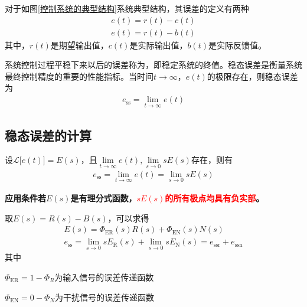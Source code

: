 对于如图\ref{控制系统的典型结构}系统典型结构，其误差的定义有两种
\begin{align}
	e(t) = r(t) - c(t)\\
	e(t) = r(t) - b(t)
\end{align}
其中，$r(t)$是期望输出值，$c(t)$是实际输出值，$b(t)$是实际反馈值。

系统控制过程平稳下来以后的误差称为，即稳定系统的终值。稳态误差是衡量系统最终控制精度的重要的性能指标。当时间$t \to \infty$，$e(t)$的极限存在，则稳态误差为
\begin{align}
	e_{\text{ss}} = \lim\limits_{t \to \infty} e(t)
\end{align}

\subsection{稳态误差的计算}

\ttheorem[终值定理]
设$\mathcal{L}\big[e(t)\big] = E(s)$，且$\lim\limits_{t \to \infty} e(t), \lim\limits_{s \to 0} sE(s)$存在，则有
\begin{align}
	e_{\text{ss}} = \lim\limits_{t \to \infty} e(t) = \lim\limits_{s \to 0} sE(s)
\end{align}

\noindent \textbf{应用条件\quad 若$E(s)$是有理分式函数，\textcolor{red}{$sE(s)$的所有极点均具有负实部}。}

取$E(s) = R(s) - B(s)$，可以求得
\begin{align}
	E(s) = \varPhi_{\text{ER}}(s)R(s) + \varPhi_{\text{EN}}(s)N(s)\\
	e_{\text{ss}} = \lim\limits_{s \to 0} sE_{\text{R}}(s) + \lim\limits_{s \to 0} s E_{\text{N}}(s) = e_{\text{ssr}} + e_{\text{ssn}}
\end{align}
其中
\begin{myitemize}
	\item $\varPhi_{\text{ER}} = 1 - \varPhi_{R}$为输入信号的误差传递函数
	\vspace*{-0.4em}
	\item $\varPhi_{\text{EN}} = 0 - \varPhi_{N}$为干扰信号的误差传递函数
	\vspace*{0.4em}
\end{myitemize}
\vspace*{0.5em}

